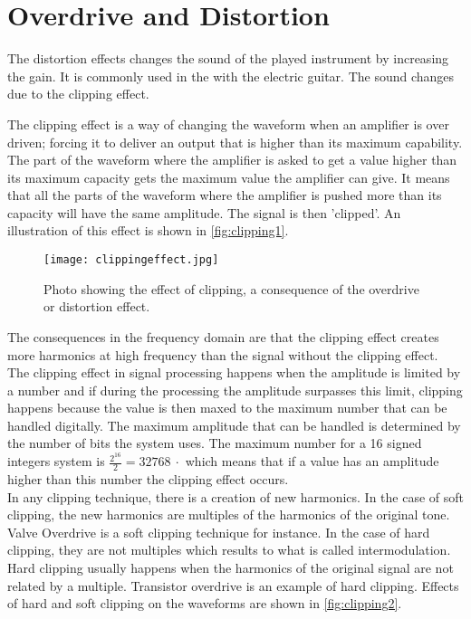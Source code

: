 \section{Overdrive and Distortion} 

The distortion effects changes the sound of the played instrument by increasing the gain. It is commonly used in the with the electric guitar. The sound changes due to the clipping effect. \\

The clipping effect is a way of changing the waveform when an amplifier is over driven; forcing it to deliver an output that is higher than its maximum capability. \\
The part of the waveform where the amplifier is asked to get a value higher than its maximum capacity gets the maximum value the amplifier can give. It means that all the parts of the waveform where the amplifier is pushed more than its capacity will have the same amplitude. The signal is then 'clipped'. An illustration of this effect is shown in \autoref{fig:clipping1}.\\

\begin{figure} [htbp]
	\centering
  \texttt{[image: clippingeffect.jpg]}
  \caption{Photo showing the effect of clipping, a consequence of the overdrive or distortion effect.}
  \label{fig:clipping1}
\end{figure}


The consequences in the frequency domain are that the clipping effect creates more harmonics at high frequency than the signal without the clipping effect. \\

The clipping effect in signal processing happens when the amplitude is limited by a number and if during the processing the amplitude surpasses this limit, clipping happens because the value is then maxed to the maximum number that can be handled digitally. The maximum amplitude that can be handled is determined by the number of bits the system uses. The maximum number for a \SI{16}{\bit}  signed integers system is $\frac{2^{16}}{2} = \SI{32768}{\cdot}$ which means that if a value has an amplitude higher than this number the clipping effect occurs. \\

In any clipping technique, there is a creation of new harmonics. In the case of soft clipping, the new harmonics are multiples of the harmonics of the original tone. Valve Overdrive is a soft clipping technique for instance. In the case of hard clipping, they are not multiples which results to what is called intermodulation. Hard clipping usually happens when the harmonics of the original signal are not related by a multiple. Transistor overdrive is an example of hard clipping.  Effects of hard and soft clipping on the waveforms are shown in \autoref{fig:clipping2}.

